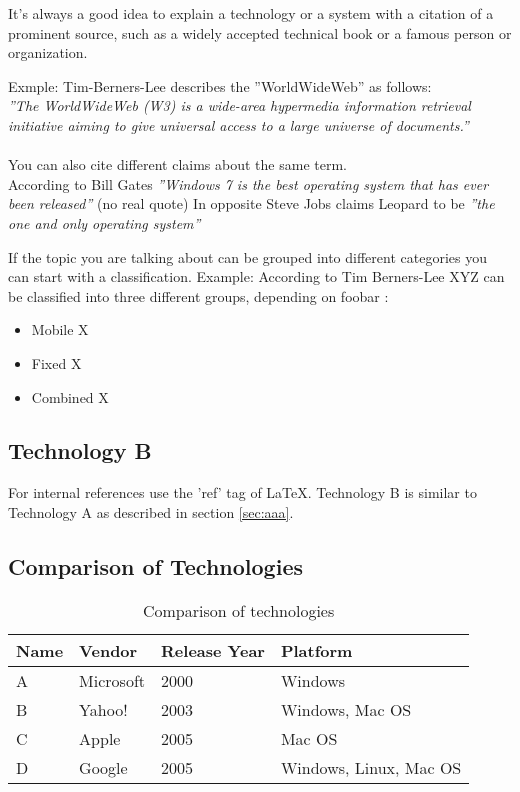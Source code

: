 It's always a good idea to explain a technology or a system with a citation of a prominent source, such as a widely accepted technical book or a famous person or organization. 

Exmple: Tim-Berners-Lee describes the ''WorldWideWeb'' as follows:
\\
\textit{''The WorldWideWeb (W3) is a wide-area hypermedia information retrieval initiative aiming to give universal access to a large universe of documents.''} \cite{timwww}
\\
\\
You can also cite different claims about the same term.
\\
According to Bill Gates \textit{''Windows 7 is the best operating system that has ever been released''} \cite{billgates} (no real quote)
In opposite Steve Jobs claims Leopard to be \textit{''the one and only operating system''} \cite{stevejobs}

If the topic you are talking about can be grouped into different categories you can start with a classification.
Example: According to Tim Berners-Lee XYZ can be classified into three different groups, depending on foobar \cite{timwww}:
	\begin{itemize}
		\item Mobile X
				\vspace{-0.1in} 
		\item Fixed X
				\vspace{-0.1in} 
		\item Combined X
 	\end{itemize}

\subsection{Technology B\label{sec:bbb}}

For internal references use the 'ref' tag of LaTeX. Technology B is similar to Technology A as described in section \ref{sec:aaa}.

\newpage

\subsection{Comparison of Technologies\label{sec:comp}}

\begin{table}[htb]
\centering
\begin{tabular}[t]{|l|l|l|l|}
\hline
Name & Vendor & Release Year & Platform \\
\hline
\hline
A & Microsoft & 2000 & Windows \\
\hline
B & Yahoo! & 2003 & Windows, Mac OS \\
\hline
C & Apple & 2005 & Mac OS \\
\hline
D & Google & 2005 & Windows, Linux, Mac OS \\
\hline
\end{tabular}
\caption{Comparison of technologies}
\label{tab:enghistory}
\end{table}

